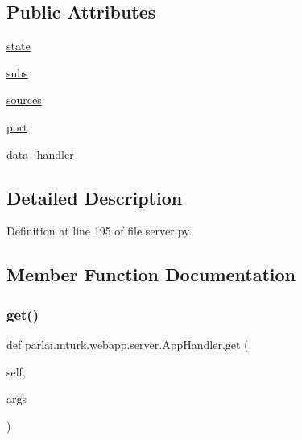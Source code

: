 \subsection*{Public Attributes}
\begin{DoxyCompactItemize}
\item 
\hyperlink{classparlai_1_1mturk_1_1webapp_1_1server_1_1AppHandler_a7193d2e1fc8447f00be8ab6374e43f32}{state}
\item 
\hyperlink{classparlai_1_1mturk_1_1webapp_1_1server_1_1AppHandler_a1c61eec19a28f77d438777da6e034cbc}{subs}
\item 
\hyperlink{classparlai_1_1mturk_1_1webapp_1_1server_1_1AppHandler_ae517a50ac0cfc7b33a5aafdc2984c71a}{sources}
\item 
\hyperlink{classparlai_1_1mturk_1_1webapp_1_1server_1_1AppHandler_a211ede0441daaf339d7b12bf119b5858}{port}
\item 
\hyperlink{classparlai_1_1mturk_1_1webapp_1_1server_1_1AppHandler_ac635a7095f1cf851b4b33cca5d6d081b}{data\+\_\+handler}
\end{DoxyCompactItemize}


\subsection{Detailed Description}


Definition at line 195 of file server.\+py.



\subsection{Member Function Documentation}
\mbox{\label{classparlai_1_1mturk_1_1webapp_1_1server_1_1AppHandler_a67f91de7041df784c72e37757e346a94}} 
\subsubsection{\texorpdfstring{get()}{get()}}
{\footnotesize\ttfamily def parlai.\+mturk.\+webapp.\+server.\+App\+Handler.\+get (\begin{DoxyParamCaption}\item[{}]{self,  }\item[{}]{args }\end{DoxyParamCaption})}



